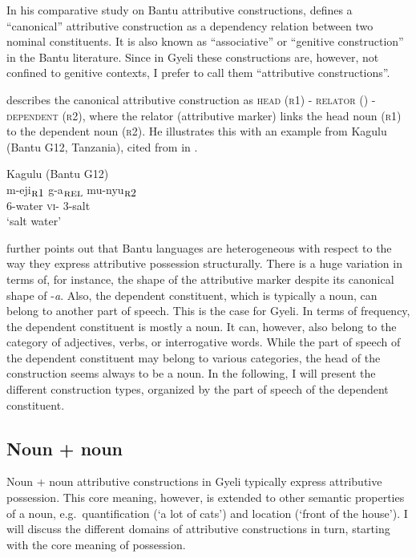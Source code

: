 In his comparative study on Bantu attributive constructions, \citet{velde2013} defines a ``canonical'' attributive construction as a dependency relation between two nominal constituents. It is also known as ``associative'' or ``genitive construction'' in the Bantu literature. Since in Gyeli these constructions are, however, not confined to genitive contexts, I prefer to call them ``attributive constructions''.  

\citet{velde2013} describes the canonical attributive construction as \textsc{head} (\textsc{r}1) - \textsc{relator} ({\REL}) - \textsc{dependent} (\textsc{r}2), where the relator (attributive marker) links the head noun (\textsc{r}1) to the dependent noun (\textsc{r}2).
He illustrates this with an example from Kagulu (Bantu G12, Tanzania), cited from \citet[86]{petzell2008} in .

\ea\label{const} Kagulu (Bantu G12)\\
  \gll  m-eji\textsubscript{${\textsc{r}}1$} g-a\textsubscript{${\textsc{rel}}$} mu-nyu\textsubscript{${\textsc{r}}2$}\\
              6-water \textsc{vi}-{\ATT} 3-salt\\
    \trans `salt water'
\z

\citet{velde2013} further points out that Bantu languages are heterogeneous with respect to the way they express attributive possession structurally. There is a huge variation in terms of, for instance, the shape of the attributive marker despite its canonical shape of {\AGR}-{\itshape a}. Also, the dependent constituent, which is typically a  noun, can belong to another part of speech. This is the case for Gyeli. In terms of frequency, the dependent constituent is mostly a noun. It can, however, also belong to the category of adjectives, verbs, or interrogative words. While the part of speech of the dependent constituent may belong to various categories, the head of the construction seems always to be a noun. In the following, I will present the different construction types, organized by the part of speech of the dependent constituent.

\subsection{Noun + noun}
\label{sec:NN}

Noun + noun attributive constructions in Gyeli typically express attributive possession. This core meaning, however, is extended to other semantic properties of a noun, e.g.~quantification (`a lot of cats') and location (`front of the house'). I will discuss the different domains of attributive constructions in turn, starting with the core meaning of possession.

